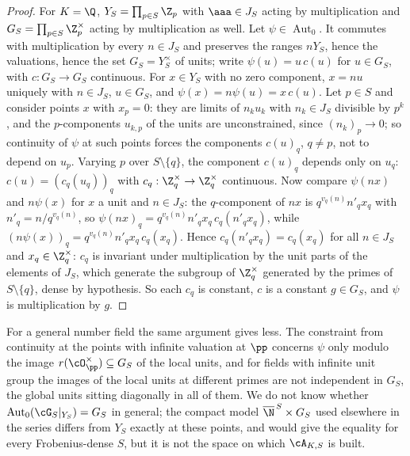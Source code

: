 \begin{proof}
For $K=\Q$, $Y_S=\prod_{p\in S}\Z_p$ with $\aaa\in J_S$ acting by multiplication and
$G_S=\prod_{p\in S}\Z_p^\times$ acting by multiplication as well. Let $\psi\in\operatorname{Aut}_0$.
It commutes with multiplication by every $n\in J_S$ and preserves the ranges $nY_S$, hence
the valuations, hence the set $G_S=Y_S^\times$ of units; write $\psi(u)=u\,c(u)$ for
$u\in G_S$, with $c:G_S\to G_S$ continuous. For $x\in Y_S$ with no zero component, $x=nu$
uniquely with $n\in J_S$, $u\in G_S$, and $\psi(x)=n\psi(u)=x\,c(u)$. Let $p\in S$ and
consider points $x$ with $x_p=0$: they are limits of $n_ku_k$ with $n_k\in J_S$ divisible by
$p^k$, and the $p$-components $u_{k,p}$ of the units are unconstrained, since
$(n_k)_p\to0$; so continuity of $\psi$ at such points forces the components $c(u)_q$, $q\ne p$,
not to depend on $u_p$. Varying $p$ over $S\setminus\{q\}$, the component $c(u)_q$ depends
only on $u_q$: $c(u)=(c_q(u_q))_q$ with $c_q:\Z_q^\times\to\Z_q^\times$ continuous. Now
compare $\psi(nx)$ and $n\psi(x)$ for $x$ a unit and $n\in J_S$: the $q$-component of $nx$ is
$q^{v_q(n)}n'_qx_q$ with $n'_q=n/q^{v_q(n)}$, so $\psi(nx)_q=q^{v_q(n)}n'_qx_q\,c_q(n'_qx_q)$,
while $(n\psi(x))_q=q^{v_q(n)}n'_qx_q\,c_q(x_q)$. Hence $c_q(n'_qx_q)=c_q(x_q)$ for all
$n\in J_S$ and $x_q\in\Z_q^\times$: $c_q$ is invariant under multiplication by the unit parts
of the elements of $J_S$, which generate the subgroup of $\Z_q^\times$ generated by the
primes of $S\setminus\{q\}$, dense by hypothesis. So each $c_q$ is constant, $c$ is a constant
$g\in G_S$, and $\psi$ is multiplication by $g$.
\end{proof}

\begin{remark}\label{XIII:rem:autgeneral}
For a general number field the same argument gives less. The constraint from continuity
at the points with infinite valuation at $\pp$ concerns $\psi$ only modulo the image
$r(\cO_\pp^\times)\subseteq G_S$ of the local units, and for fields with infinite unit group
the images of the local units at different primes are not independent in $G_S$, the global
units sitting diagonally in all of them. We do not know whether
$\operatorname{Aut}_0(\cG_S|_{Y_S})=G_S$ in general; the compact model $\overline{\N}^{\,S}\times G_S$
used elsewhere in the series differs from $Y_S$ exactly at these points, and would give the
equality for every Frobenius-dense $S$, but it is not the space on which $\cA_{K,S}$ is built.
\end{remark}

